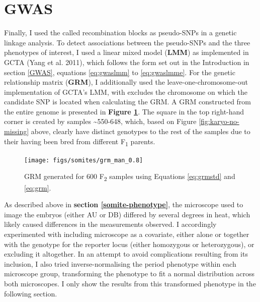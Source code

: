 \documentclass[
]{book}
\begin{document}
\clearpage

\hypertarget{somite-assoc-tests}{%
\section{GWAS}\label{somite-assoc-tests}}

Finally, I used the called recombination blocks as pseudo-SNPs in a genetic linkage analysis. To detect associations between the pseudo-SNPs and the three phenotypes of interest, I used a linear mixed model (\textbf{LMM}) as implemented in GCTA (Yang et al. 2011), which follows the form set out in the Introduction in section \ref{GWAS}, equations \eqref{eq:gwaslmm} to \eqref{eq:gwaslmme}. For the genetic relationship matrix (\textbf{GRM}), I additionally used the leave-one-chromosome-out implementation of GCTA's LMM, with excludes the chromosome on which the candidate SNP is located when calculating the GRM. A GRM constructed from the entire genome is presented in \textbf{Figure \ref{fig:somite-grm}}. The square in the top right-hand corner is created by samples \textasciitilde550-648, which, based on Figure \ref{fig:karyo-no-missing} above, clearly have distinct genotypes to the rest of the samples due to their having been bred from different F\textsubscript{1} parents.



\begin{figure}
\texttt{[image: figs/somites/grm\_man\_0.8]} \caption{GRM generated for 600 F\textsubscript{2} samples using Equations \eqref{eq:grmstd} and \eqref{eq:grm}.}\label{fig:somite-grm}
\end{figure}

As described above in \textbf{section \ref{somite-phenotype}}, the microscope used to image the embryos (either AU or DB) differed by several degrees in heat, which likely caused differences in the measurements observed. I accordingly experimented with including microscope as a covariate, either alone or together with the genotype for the reporter locus (either homozygous or heterozygous), or excluding it altogether. In an attempt to avoid complications resulting from its inclusion, I also tried inverse-normalising the period phenotype within each microscope group, transforming the phenotype to fit a normal distribution across both microscopes. I only show the results from this transformed phenotype in the following section.
\end{document}
